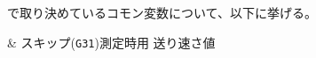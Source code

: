 
\MMname で取り決めているコモン変数について、以下に挙げる。



\begin{twoCtable}{}
 &  スキップ(\verb|G31|)測定時用 送り速さ値
\end{twoCtable}



